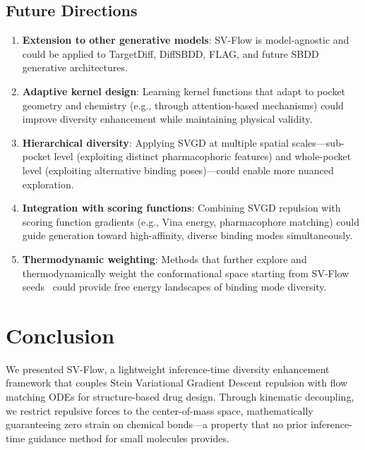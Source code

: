 \documentclass[a4paper,11pt]{article}
\begin{document}
\subsection{Future Directions}

\begin{enumerate}
  \item \textbf{Extension to other generative models}: SV-Flow is model-agnostic
    and could be applied to TargetDiff, DiffSBDD, FLAG, and future SBDD
    generative architectures.
  \item \textbf{Adaptive kernel design}: Learning kernel functions that adapt to
    pocket geometry and chemistry (e.g., through attention-based mechanisms)
    could improve diversity enhancement while maintaining physical validity.
  \item \textbf{Hierarchical diversity}: Applying SVGD at multiple spatial
    scales---sub-pocket level (exploiting distinct pharmacophoric features) and
    whole-pocket level (exploiting alternative binding poses)---could enable more
    nuanced exploration.
  \item \textbf{Integration with scoring functions}: Combining SVGD repulsion
    with scoring function gradients (e.g., Vina energy, pharmacophore matching)
    could guide generation toward high-affinity, diverse binding modes
    simultaneously.
  \item \textbf{Thermodynamic weighting}: Methods that further explore and
    thermodynamically weight the conformational space starting from SV-Flow
    seeds~\cite{lam2026metadiffusion} could provide free energy landscapes of
    binding mode diversity.
\end{enumerate}

\section{Conclusion}

We presented SV-Flow, a lightweight inference-time diversity enhancement
framework that couples Stein Variational Gradient Descent repulsion with flow
matching ODEs for structure-based drug design.  Through kinematic decoupling, we
restrict repulsive forces to the center-of-mass space, mathematically
guaranteeing zero strain on chemical bonds---a property that no prior
inference-time guidance method for small molecules provides.
\end{document}

